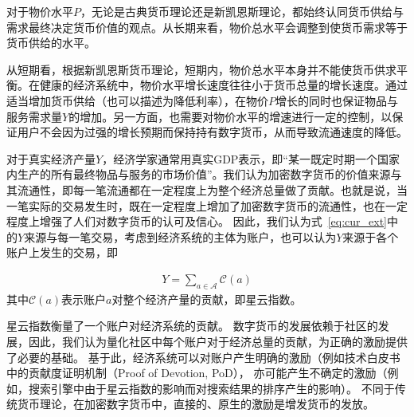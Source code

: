 
对于物价水平$P$，无论是古典货币理论还是新凯恩斯理论，都始终认同货币供给与需求最终决定货币价值的观点。从长期来看，物价总水平会调整到使货币需求等于货币供给的水平。

从短期看，根据新凯恩斯货币理论，短期内，物价总水平本身并不能使货币供求平衡。在健康的经济系统中，物价水平增长速度往往小于货币总量的增长速度。通过适当增加货币供给（也可以描述为降低利率），在物价$P$增长的同时也保证物品与服务需求量$Y$的增加。另一方面，也需要对物价水平的增速进行一定的控制，以保证用户不会因为过强的增长预期而保持持有数字货币，从而导致流通速度的降低。




对于真实经济产量$Y$，经济学家通常用真实GDP表示，即“某一既定时期一个国家内生产的所有最终物品与服务的市场价值”。我们认为加密数字货币的价值来源与其流通性，即每一笔流通都在一定程度上为整个经济总量做了贡献。也就是说，当一笔实际的交易发生时，既在一定程度上增加了加密数字货币的流通性，也在一定程度上增强了人们对数字货币的认可及信心。
因此，我们认为式~\ref{eq:cur_ext}中的$Y$来源与每一笔交易，考虑到经济系统的主体为账户，也可以认为$Y$来源于各个账户上发生的交易，即

\begin{align}
Y=\sum_{a\in \mathcal{A}} \mathcal{C}(a)
\end{align}
\noindent 其中$\mathcal{C}(a)$表示账户$a$对整个经济产量的贡献，即星云指数。

星云指数衡量了一个账户对经济系统的贡献。
数字货币的发展依赖于社区的发展，因此，我们认为量化社区中每个账户对于经济总量的贡献，为正确的激励提供了必要的基础。
基于此，经济系统可以对账户产生明确的激励（例如技术白皮书中的贡献度证明机制（Proof of Devotion, PoD），
亦可能产生不确定的激励（例如，搜索引擎中由于星云指数的影响而对搜索结果的排序产生的影响）。
不同于传统货币理论，在加密数字货币中，直接的、原生的激励是增发货币的发放。




